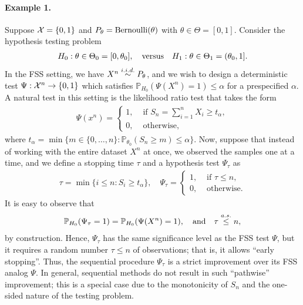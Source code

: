 \documentclass[12pt]{article}
\begin{document}
\paragraph{Example 1.} Suppose ${\cal X} = \{0,1\}$ and $P_\theta = \mathrm{Bernoulli}(\theta)$ with $\theta \in \Theta = [0,1]$. Consider the hypothesis testing problem 
\begin{align}
    H_0: \theta \in \Theta_0 = [0, \theta_0], \quad \text{versus} \quad H_1: \theta \in \Theta_1 = (\theta_0, 1]. 
\end{align}
In the FSS setting, we have $X^n \stackrel{i.i.d.}{\sim} P_\theta$, and we wish to design a deterministic test $\Psi:{\cal X}^n \to \{0,1\}$ which satisfies $\mathbb{P}_{H_0}(\Psi(X^n)=1) \leq \alpha$ for a prespecified $\alpha$. A natural test in this setting is the likelihood ratio test that takes the form 
\begin{align}
    \Psi(x^n) = \begin{cases}
        1, & \text{ if } S_n = \sum_{i=1}^n X_i \geq t_\alpha, \\
        0, & \text{ otherwise}, 
    \end{cases}
\end{align}
where  $t_\alpha = \min \{m \in \{0, \ldots, n\}: \mathbb{P}_{\theta_0}(S_n \geq m) \leq \alpha\}$. Now, suppose that instead of working with the entire dataset $X^n$ at once, we observed the samples one at a time, and we define a stopping time $\tau$ and a hypothesis test $\Psi_\tau$ as  
\begin{align}
    \tau = \min \{i \leq n: S_i \geq t_\alpha\}, \quad \Psi_\tau = \begin{cases}
        1,& \text{ if } \tau \leq n, \\
        0, & \text{ otherwise}.  
    \end{cases}
\end{align}
It is easy to observe that 
\begin{align}
    \mathbb{P}_{H_0}(\Psi_\tau = 1) = \mathbb{P}_{H_0}(\Psi(X^n)=1), \quad \text{and} \quad  \tau \stackrel{a.s.}{\leq} n, 
\end{align}
by construction. Hence, $\Psi_\tau$ has the same significance level as the FSS test $\Psi$, but it requires a random number $\tau \leq n$ of observations; that is, it allows  ``early stopping''.  Thus, the sequential procedure $\Psi_\tau$ is a strict improvement over its FSS analog $\Psi$. In general, sequential methods do not result in such ``pathwise'' improvement; this is a special case due to the monotonicity of $S_n$ and the one-sided nature of the testing problem. 
\end{document}
